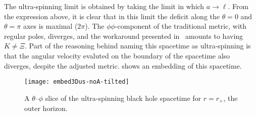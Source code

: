 \documentclass[
twoside,
openright,
frontopenright,
]{dmathesis}
\begin{document}
The ultra-spinning limit is obtained by taking the limit in which
$a\to\ell$. From the expression above, it is clear that in this limit the
deficit along the $\theta = 0$ and $\theta=\pi$ axes is maximal ($2\pi$). The
$\phi\phi$-component of the traditional metric, with regular poles, diverges,
and the workaround presented in~\cite{Hennigar:2014cfa} amounts to having
$K\neq \Xi$. Part of the reasoning behind naming this spacetime as ultra-spinning
is that the angular velocity evaluted on the boundary of the spacetime also
diverges, despite the adjusted metric.  shows an
embedding of this spacetime.

\begin{figure}
  \centering
  \texttt{[image: embed3Dus-noA-tilted]}
  \caption{\label{fig:embed3Dus-noA-tilted}A $\theta$--$\phi$ slice of the
    ultra-spinning black hole spacetime for $r=r_+$, the outer horizon.}
\end{figure}
\end{document}
